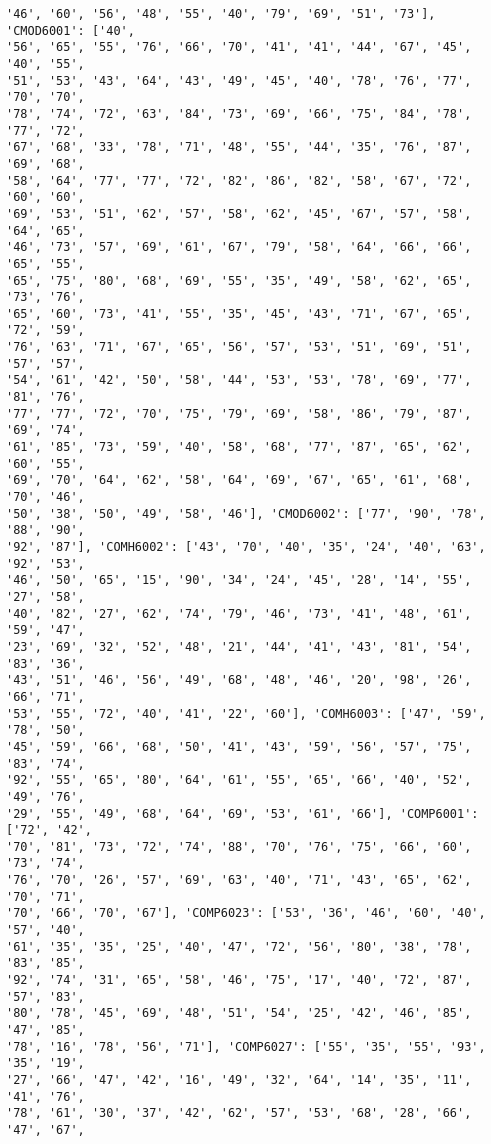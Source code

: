 \documentclass[11pt]{article}
\begin{document}
\begin{Verbatim}[commandchars=\\\{\}]
'46', '60', '56', '48', '55', '40', '79', '69', '51', '73'], 'CMOD6001': ['40',
'56', '65', '55', '76', '66', '70', '41', '41', '44', '67', '45', '40', '55',
'51', '53', '43', '64', '43', '49', '45', '40', '78', '76', '77', '70', '70',
'78', '74', '72', '63', '84', '73', '69', '66', '75', '84', '78', '77', '72',
'67', '68', '33', '78', '71', '48', '55', '44', '35', '76', '87', '69', '68',
'58', '64', '77', '77', '72', '82', '86', '82', '58', '67', '72', '60', '60',
'69', '53', '51', '62', '57', '58', '62', '45', '67', '57', '58', '64', '65',
'46', '73', '57', '69', '61', '67', '79', '58', '64', '66', '66', '65', '55',
'65', '75', '80', '68', '69', '55', '35', '49', '58', '62', '65', '73', '76',
'65', '60', '73', '41', '55', '35', '45', '43', '71', '67', '65', '72', '59',
'76', '63', '71', '67', '65', '56', '57', '53', '51', '69', '51', '57', '57',
'54', '61', '42', '50', '58', '44', '53', '53', '78', '69', '77', '81', '76',
'77', '77', '72', '70', '75', '79', '69', '58', '86', '79', '87', '69', '74',
'61', '85', '73', '59', '40', '58', '68', '77', '87', '65', '62', '60', '55',
'69', '70', '64', '62', '58', '64', '69', '67', '65', '61', '68', '70', '46',
'50', '38', '50', '49', '58', '46'], 'CMOD6002': ['77', '90', '78', '88', '90',
'92', '87'], 'COMH6002': ['43', '70', '40', '35', '24', '40', '63', '92', '53',
'46', '50', '65', '15', '90', '34', '24', '45', '28', '14', '55', '27', '58',
'40', '82', '27', '62', '74', '79', '46', '73', '41', '48', '61', '59', '47',
'23', '69', '32', '52', '48', '21', '44', '41', '43', '81', '54', '83', '36',
'43', '51', '46', '56', '49', '68', '48', '46', '20', '98', '26', '66', '71',
'53', '55', '72', '40', '41', '22', '60'], 'COMH6003': ['47', '59', '78', '50',
'45', '59', '66', '68', '50', '41', '43', '59', '56', '57', '75', '83', '74',
'92', '55', '65', '80', '64', '61', '55', '65', '66', '40', '52', '49', '76',
'29', '55', '49', '68', '64', '69', '53', '61', '66'], 'COMP6001': ['72', '42',
'70', '81', '73', '72', '74', '88', '70', '76', '75', '66', '60', '73', '74',
'76', '70', '26', '57', '69', '63', '40', '71', '43', '65', '62', '70', '71',
'70', '66', '70', '67'], 'COMP6023': ['53', '36', '46', '60', '40', '57', '40',
'61', '35', '35', '25', '40', '47', '72', '56', '80', '38', '78', '83', '85',
'92', '74', '31', '65', '58', '46', '75', '17', '40', '72', '87', '57', '83',
'80', '78', '45', '69', '48', '51', '54', '25', '42', '46', '85', '47', '85',
'78', '16', '78', '56', '71'], 'COMP6027': ['55', '35', '55', '93', '35', '19',
'27', '66', '47', '42', '16', '49', '32', '64', '14', '35', '11', '41', '76',
'78', '61', '30', '37', '42', '62', '57', '53', '68', '28', '66', '47', '67',

\end{Verbatim}
\end{document}
